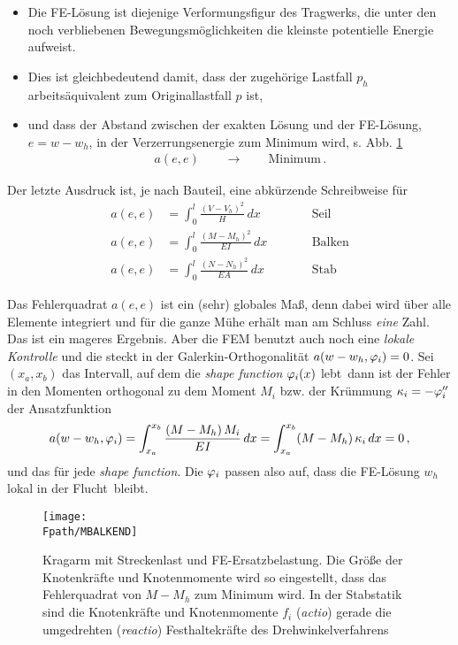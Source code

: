 \begin{itemize}
  \item Die FE-L\"{o}sung ist diejenige Verformungsfigur des Tragwerks, die unter den
noch verbliebenen Bewegungsm\"{o}glichkeiten die kleinste potentielle Energie aufweist.
  \item Dies ist gleichbedeutend damit, dass der zugeh\"{o}rige Lastfall $p_h$ arbeits\"{a}quivalent zum
Originallastfall $p$ ist,
  \item und dass der Abstand zwischen der exakten L\"{o}sung und der
FE-L\"{o}sung, $e = w - w_h$, in der Verzerrungsenergie zum Minimum wird, s. Abb. \ref{MBalken}
\begin{align}\label{Eq8}
a(e,e) \qquad \rightarrow \qquad \mbox{Minimum}\,.
\end{align}
\end{itemize}
Der letzte Ausdruck ist, je nach Bauteil, eine abk\"{u}rzende Schreibweise f\"{u}r
\begin{subequations}
\begin{alignat}{2}
a(e,e) &= \int_{0}^{l}\frac{(V - V_h)^2}{H}\,dx &&\qquad \text{Seil} \\
a(e,e) &= \int_{0}^{l}\frac{(M - M_h)^2}{EI}\,dx &&\qquad \text{Balken} \\
a(e,e) &= \int_{0}^{l}\frac{(N - N_h)^2}{EA}\,dx &&\qquad \text{Stab}
\end{alignat}
\end{subequations}
\begin{remark}
Das Fehlerquadrat $a(e,e)$ ist ein (sehr) globales Ma{\ss}, denn dabei wird \"{u}ber alle Elemente integriert und f\"{u}r die ganze M\"{u}he  erh\"{a}lt man am Schluss {\em eine\/}  Zahl. Das ist ein mageres Ergebnis. Aber die FEM benutzt auch noch eine {\em lokale Kontrolle\/} und die steckt in der Galerkin-Orthogonalit\"{a}t $a(w-w_h,\varphi_i) = 0$. Sei $(x_a,x_b)$ das Intervall, auf dem die {\em shape function\/} $\varphi_i(x)$ \glq lebt\grq\, dann ist der Fehler in den Momenten orthogonal zu dem Moment $M_i$ bzw. der Kr\"{u}mmung $\kappa_i = -\varphi_i''$ der Ansatzfunktion
\begin{align}\label{Eq18}
a(w-w_h,\varphi_i) = \int_{x_a}^{x_b} \frac{(M - M_h)\,M_i}{EI}\,dx =  \int_{x_a}^{x_b} (M - M_h)\,\kappa_i\,dx =0\,,
\end{align}
und das f\"{u}r jede {\em shape function\/}. Die $\varphi_i$ passen also auf, dass die FE-L\"{o}sung $w_h$ lokal \glq in der Flucht\grq\ bleibt.
\end{remark}

\vspace{-1cm}
\begin{figure}[tbp] \centering
\if {} \sidecaption \fi
\texttt{[image: \\Fpath/MBALKEND]}
\caption{Kragarm mit Streckenlast und FE-Ersatzbelastung. Die Gr\"{o}{\ss}e der Knotenkr\"{a}fte und
Knotenmomente wird so eingestellt, dass das Fehlerquadrat von $M - M_h$ zum Minimum wird.
In der Stabstatik sind die Knotenkr\"{a}fte und Knotenmomente $f_i$ ({\em actio\/}) gerade die umgedrehten ({\em reactio\/}) Festhaltekr\"{a}fte des Drehwinkelverfahrens}
\label{MBalken}
\end{figure}%

